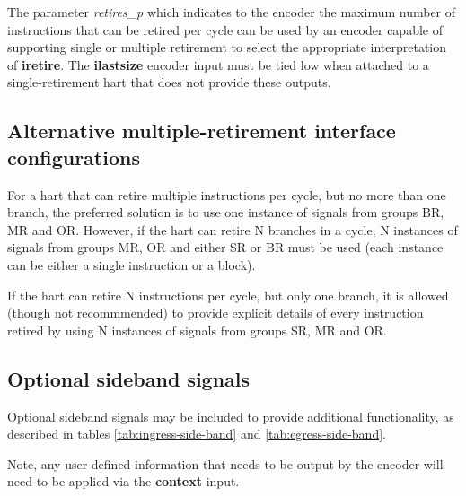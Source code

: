 The parameter \textit{retires\_p} which indicates to the encoder the maximum number of 
instructions that can be retired per cycle can be used by an encoder capable of supporting single or 
multiple retirement to select the appropriate interpretation of \textbf{iretire}.  
The \textbf{ilastsize} encoder input must be tied low when attached to a single-retirement
hart that does not provide these outputs.


\subsection{Alternative multiple-retirement interface configurations} \label{sec:alt-multi}

For a hart that can retire multiple instructions per cycle, but no more than one branch, the preferred 
solution is to use one instance of signals from groups BR, MR and OR.  However, if the hart can retire 
N branches in a cycle, N instances of signals from groups MR, OR and either SR or BR must be used 
(each instance can be either a single instruction or a block).

If the hart can retire N instructions per cycle, but only one branch, it is allowed (though not recommmended)
to provide explicit details of every instruction retired by using N instances of signals from groups
SR, MR and OR.

\subsection{Optional sideband signals}

Optional sideband signals may be included to provide additional functionality, as described in
tables \ref{tab:ingress-side-band} and \ref{tab:egress-side-band}.

Note, any user defined information that needs to be output by the encoder
will need to be applied via the \textbf{context} input.

